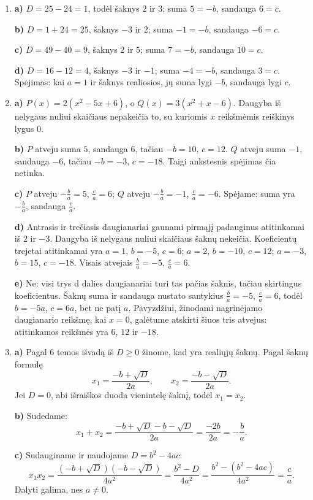 \documentclass[12pt,a4paper]{article}
\begin{document}
\begin{enumerate}
\item \textbf{a)} $D=25-24=1$, todėl šaknys $2$ ir $3$; suma $5=-b$, sandauga $6=c$.

\textbf{b)} $D=1+24=25$, šaknys $-3$ ir $2$; suma $-1=-b$, sandauga $-6=c$.

\textbf{c)} $D=49-40=9$, šaknys $2$ ir $5$; suma $7=-b$, sandauga $10=c$.

\textbf{d)} $D=16-12=4$, šaknys $-3$ ir $-1$; suma $-4=-b$, sandauga $3=c$. Spėjimas: kai $a=1$ ir šaknys realiosios, jų suma lygi $-b$, sandauga lygi $c$.
\item \textbf{a)} $P(x)=2(x^2-5x+6)$, o $Q(x)=3(x^2+x-6)$. Daugyba iš nelygaus nuliui skaičiaus nepakeičia to, su kuriomis $x$ reikšmėmis reiškinys lygus $0$.

\textbf{b)} $P$ atveju suma $5$, sandauga $6$, tačiau $-b=10$, $c=12$. $Q$ atveju suma $-1$, sandauga $-6$, tačiau $-b=-3$, $c=-18$. Taigi ankstesnis spėjimas čia netinka.

\textbf{c)} $P$ atveju $-\frac{b}{a}=5$, $\frac{c}{a}=6$; $Q$ atveju $-\frac{b}{a}=-1$, $\frac{c}{a}=-6$. Spėjame: suma yra $-\frac{b}{a}$, sandauga $\frac{c}{a}$.

\textbf{d)} Antrasis ir trečiasis daugianariai gaunami pirmąjį padauginus atitinkamai iš $2$ ir $-3$. Daugyba iš nelygaus nuliui skaičiaus šaknų nekeičia. Koeficientų trejetai atitinkamai yra $a=1$, $b=-5$, $c=6$; $a=2$, $b=-10$, $c=12$; $a=-3$, $b=15$, $c=-18$. Visais atvejais $\frac{b}{a}=-5$, $\frac{c}{a}=6$.

\textbf{e)} Ne: visi trys d dalies daugianariai turi tas pačias šaknis, tačiau skirtingus koeficientus. Šaknų suma ir sandauga nustato santykius $\frac{b}{a}=-5$, $\frac{c}{a}=6$, todėl $b=-5a$, $c=6a$, bet ne patį $a$. Pavyzdžiui, žinodami nagrinėjamo daugianario reikšmę, kai $x=0$, galėtume atskirti šiuos tris atvejus: atitinkamos reikšmės yra $6$, $12$ ir $-18$.
\item \textbf{a)} Pagal 6 temos išvadą iš $D\geq0$ žinome, kad yra realiųjų šaknų. Pagal šaknų formulę
\[x_1=\frac{-b+\sqrt{D}}{2a},\qquad x_2=\frac{-b-\sqrt{D}}{2a}.\]
Jei $D=0$, abi išraiškos duoda vienintelę šaknį, todėl $x_1=x_2$.

\textbf{b)} Sudedame:
\[x_1+x_2=\frac{-b+\sqrt D-b-\sqrt D}{2a}=\frac{-2b}{2a}=-\frac{b}{a}.\]

\textbf{c)} Sudauginame ir naudojame $D=b^2-4ac$:
\[x_1x_2=\frac{(-b+\sqrt D)(-b-\sqrt D)}{4a^2}=\frac{b^2-D}{4a^2}=\frac{b^2-(b^2-4ac)}{4a^2}=\frac{c}{a}.\]
Dalyti galima, nes $a\ne0$.


\end{enumerate}
\end{document}

